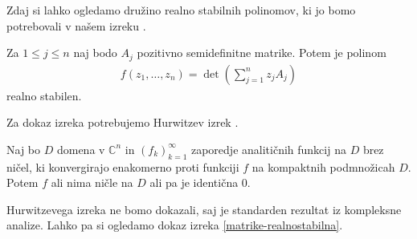 Zdaj si lahko ogledamo družino realno stabilnih polinomov, ki jo bomo potrebovali v našem izreku \cite{JuliusPetter}.
\begin{izrek}\label{matrike-realnostabilna}
    Za \(1\leq j \leq n\) naj bodo \(A_j\) pozitivno semidefinitne matrike. Potem je polinom
    \begin{align*}
        f(z_1, \ldots, z_n) = \det\left(\sum_{j=1}^n z_j A_j\right)
    \end{align*}
    realno stabilen.
\end{izrek}
Za dokaz izreka potrebujemo Hurwitzev izrek \cite{freitag1}.
\begin{izrek}\label{hurwitz}
    Naj bo \(D\) domena v \(\mathbb C^n\) in \((f_k)_{k=1}^\infty\) zaporedje analitičnih funkcij na \(D\) brez ničel, ki konvergirajo enakomerno proti funkciji \(f\) na kompaktnih podmnožicah \(D\). Potem \(f\) ali nima ničle na \(D\) ali pa je identična \(0\).
\end{izrek}
Hurwitzevega izreka ne bomo dokazali, saj je standarden rezultat iz kompleksne analize. Lahko pa si ogledamo dokaz izreka \ref{matrike-realnostabilna}.
